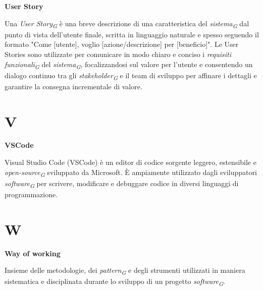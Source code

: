\documentclass{article}
\begin{document}
\textbf{User Story}

\vspace{0.1cm}

Una \textit{User Story}\textsubscript{\textit{G}} è una breve descrizione di una caratteristica del \textit{sistema}\textsubscript{\textit{G}} dal punto di vista dell'utente finale, scritta in linguaggio naturale e spesso seguendo il formato "Come [utente], voglio [azione/descrizione] per [beneficio]". Le User Stories sono utilizzate per comunicare in modo chiaro e conciso i \textit{requisiti funzionali}\textsubscript{\textit{G}} del \textit{sistema}\textsubscript{\textit{G}}, focalizzandosi sul valore per l'utente e consentendo un dialogo continuo tra gli \textit{stakeholder}\textsubscript{\textit{G}} e il team di sviluppo per affinare i dettagli e garantire la consegna incrementale di valore.


\pagebreak
\section*{V}
{}

\vspace{0.4cm}

\textbf{VSCode}

\vspace{0.1cm}

Visual Studio Code (VSCode) è un editor di codice sorgente leggero, estensibile e \textit{open-source}\textsubscript{\textit{G}} sviluppato da Microsoft. È ampiamente utilizzato dagli sviluppatori \textit{software}\textsubscript{\textit{G}} per scrivere, modificare e debuggare codice in diversi linguaggi di programmazione.

\pagebreak
\section*{W}
{}

\vspace{0.4cm}

\textbf{Way of working}

\vspace{0.1cm}

Insieme delle metodologie, dei \textit{pattern}\textsubscript{\textit{G}} e degli strumenti utilizzati in maniera sistematica e disciplinata durante lo sviluppo di un progetto \textit{software}\textsubscript{\textit{G}}.
\end{document}
